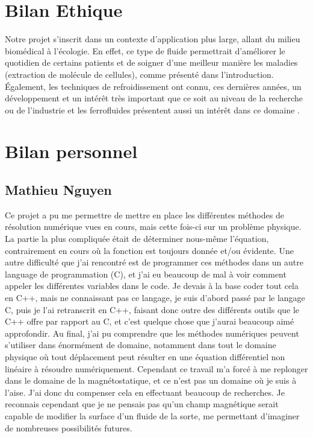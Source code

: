 \documentclass[10pt,a4paper]{article}
\begin{document}
\section{Bilan Ethique}
Notre projet s'inscrit dans un contexte d'application plus large, allant du milieu biomédical à l'écologie. En effet, ce type de fluide permettrait d'améliorer le quotidien de certains patients et de soigner d'une meilleur manière les maladies (extraction de molécule de cellules), comme présenté dans l'introduction. Également, les techniques de refroidissement ont connu, ces dernières années, un développement et un intérêt très important que ce soit au niveau de la recherche ou de l’industrie et les ferrofluides présentent aussi un intérêt dans ce domaine \cite{site3}.
\section{Bilan personnel}
\subsection{Mathieu Nguyen}
Ce projet a pu me permettre de mettre en place les différentes méthodes de résolution numérique vues en cours, mais cette fois-ci sur un problème physique. La partie la plus compliquée était de déterminer nous-même l'équation, contrairement en cours où la fonction est toujours donnée et/ou évidente. Une autre difficulté que j'ai rencontré est de programmer ces méthodes dans un autre language de programmation (C), et j'ai eu beaucoup de mal à voir comment appeler les différentes variables dans le code. Je devais à la base coder tout cela en C++, mais ne connaissant pas ce langage, je suis d'abord passé par le langage C, puis je l'ai retranscrit en C++, faisant donc outre des différents outils que le C++ offre par rapport au C, et c'est quelque chose que j'aurai beaucoup aimé approfondir.
\newline
Au final, j'ai pu comprendre que les méthodes numériques peuvent s'utiliser dans énormément de domaine, notamment dans tout le domaine physique où tout déplacement peut résulter en une équation différentiel non linéaire à résoudre numériquement. Cependant ce travail m'a forcé à me replonger dans le domaine de la magnétostatique, et ce n'est pas un domaine où je suis à l'aise. J'ai donc du compenser cela en effectuant beaucoup de recherches. Je reconnais cependant que je ne pensais pas qu'un champ magnétique serait capable de modifier la surface d'un fluide de la sorte, me permettant d'imaginer de nombreuses possibilités futures.
\end{document}
